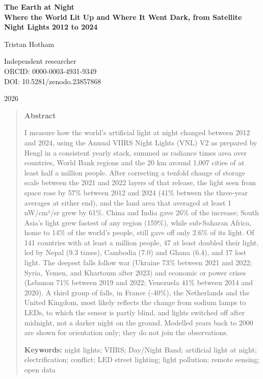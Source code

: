 \documentclass[11pt,a4paper]{article}
\begin{document}
\begin{center}
{\Large\bfseries The Earth at Night\\[2pt] Where the World Lit Up and Where It Went Dark, from Satellite Night Lights 2012 to 2024\par}
\vspace{1.2em}
{\large Tristan Hotham\par}
\vspace{0.3em}
{\small Independent researcher\\
ORCID: 0000-0003-4931-9349\\
DOI: 10.5281/zenodo.23857868\par}
\vspace{0.8em}
2026
\end{center}

\begin{quote}
\small
\begin{center}\textbf{Abstract}\end{center}
I measure how the world's artificial light at night changed between 2012 and 2024, using the Annual VIIRS Night Lights (VNL) V2 as prepared by Hengl in a consistent yearly stack, summed as radiance times area over countries, World Bank regions and the 20 km around 1,007 cities of at least half a million people. After correcting a tenfold change of storage scale between the 2021 and 2022 layers of that release, the light seen from space rose by 57\% between 2012 and 2024 (41\% between the three-year averages at either end), and the land area that averaged at least 1 nW/cm²/sr grew by 61\%. China and India gave 26\% of the increase; South Asia's light grew fastest of any region (159\%), while sub-Saharan Africa, home to 14\% of the world's people, still gave off only 2.6\% of its light. Of 141 countries with at least a million people, 47 at least doubled their light, led by Nepal (9.3 times), Cambodia (7.0) and Ghana (6.4), and 17 lost light. The deepest falls follow war (Ukraine 73\% between 2021 and 2022; Syria, Yemen, and Khartoum after 2023) and economic or power crises (Lebanon 71\% between 2019 and 2022; Venezuela 41\% between 2014 and 2020). A third group of falls, in France (-40\%), the Netherlands and the United Kingdom, most likely reflects the change from sodium lamps to LEDs, to which the sensor is partly blind, and lights switched off after midnight, not a darker night on the ground. Modelled years back to 2000 are shown for orientation only; they do not join the observations.

\textbf{Keywords:} night lights; VIIRS; Day/Night Band; artificial light at night; electrification; conflict; LED street lighting; light pollution; remote sensing; open data
\end{quote}
\end{document}
